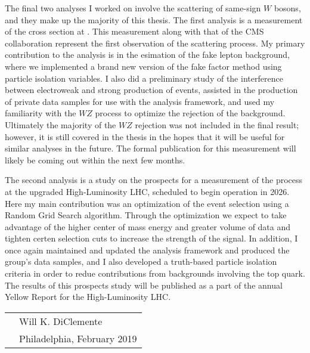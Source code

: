 The final two analyses I worked on involve the scattering of same-sign $W$ bosons, and they make up the majority of this thesis.
The first analysis is a measurement of the \ssww cross section at .
This measurement along with that of the CMS collaboration represent the first observation of the \ssww scattering process.
My primary contribution to the analysis is in the esimation of the fake lepton background, where we implemented a brand new version of the fake factor method using particle isolation variables.
I also did a preliminary study of the interference between electroweak and strong production of \ssww events, assisted in the production of private data samples for use with the analysis framework, and used my familiarity with the $WZ$ process to optimize the rejection of the background.
Ultimately the majority of the $WZ$ rejection was not included in the final result; however, it is still covered in the thesis in the hopes that it will be useful for similar analyses in the future.
The formal publication for this measurement will likely be coming out within the next few months.

The second \ssww analysis is a study on the prospects for a measurement of the process at the upgraded High-Luminosity LHC, scheduled to begin operation in 2026.
Here my main contribution was an optimization of the event selection using a Random Grid Search algorithm.
Through the optimization we expect to take advantage of the higher center of mass energy and greater volume of data and tighten certen selection cuts to increase the strength of the \ssww signal.
In addition, I once again maintained and updated the analysis framework and produced the group's data samples, and I also developed a truth-based particle isolation criteria in order to redue contributions from backgrounds involving the top quark.
The results of this prospects study will be published as a part of the annual Yellow Report for the High-Luminosity LHC.



\vspace{0.05\textheight}

\begin{tabular}{p{} l}
  & Will K. DiClemente           \\
  & Philadelphia, February 2019  \\
\end{tabular}

